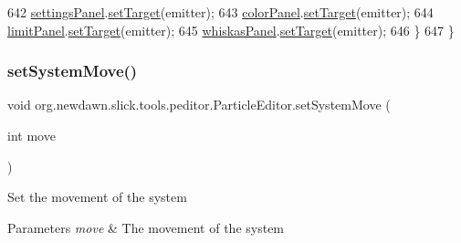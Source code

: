\begin{DoxyCode}
642             \mbox{\hyperlink{classorg_1_1newdawn_1_1slick_1_1tools_1_1peditor_1_1_particle_editor_a520df4460af7a7d67e0b5e38f07aaab2}{settingsPanel}}.\mbox{\hyperlink{classorg_1_1newdawn_1_1slick_1_1tools_1_1peditor_1_1_control_panel_a83d17b9ce4698ad051b90a27e9bc08d0}{setTarget}}(emitter);
643             \mbox{\hyperlink{classorg_1_1newdawn_1_1slick_1_1tools_1_1peditor_1_1_particle_editor_a16beabbea558c6b1d18e83566e52cb94}{colorPanel}}.\mbox{\hyperlink{classorg_1_1newdawn_1_1slick_1_1tools_1_1peditor_1_1_control_panel_a83d17b9ce4698ad051b90a27e9bc08d0}{setTarget}}(emitter);
644             \mbox{\hyperlink{classorg_1_1newdawn_1_1slick_1_1tools_1_1peditor_1_1_particle_editor_ab08f2a8de74f4faa5c302a164031af8e}{limitPanel}}.\mbox{\hyperlink{classorg_1_1newdawn_1_1slick_1_1tools_1_1peditor_1_1_control_panel_a83d17b9ce4698ad051b90a27e9bc08d0}{setTarget}}(emitter);
645             \mbox{\hyperlink{classorg_1_1newdawn_1_1slick_1_1tools_1_1peditor_1_1_particle_editor_a6c7ab37c6cad16814266c87eced04ffe}{whiskasPanel}}.\mbox{\hyperlink{classorg_1_1newdawn_1_1slick_1_1tools_1_1peditor_1_1_control_panel_a83d17b9ce4698ad051b90a27e9bc08d0}{setTarget}}(emitter);
646         \}
647     \}
\end{DoxyCode}
\mbox{\label{classorg_1_1newdawn_1_1slick_1_1tools_1_1peditor_1_1_particle_editor_a52eae40771f51d69dd3a774af5c2e9ab}} 
\subsubsection{\texorpdfstring{set\+System\+Move()}{setSystemMove()}}
{\footnotesize\ttfamily void org.\+newdawn.\+slick.\+tools.\+peditor.\+Particle\+Editor.\+set\+System\+Move (\begin{DoxyParamCaption}\item[{int}]{move }\end{DoxyParamCaption})\hspace{0.3cm}{\ttfamily [inline]}}

Set the movement of the system


\begin{DoxyParams}{Parameters}
{\em move} & The movement of the system \\
\hline
\end{DoxyParams}

